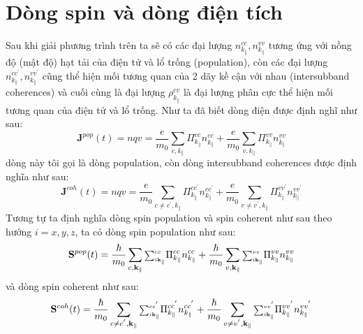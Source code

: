 \section{Dòng spin và dòng điện tích}
Sau khi giải phương trình trên ta sẽ có các đại lượng $n_{k_{\parallel}}^{cc},n_{k_{\parallel}}^{vv}$ tương ứng với nồng độ (mật độ)  hạt tải của điện tử và lổ trống (population), còn các đại lượng $n_{k_{\parallel}}^{cc^{'}},n_{k_{\parallel}}^{vv^{'}}$ cũng thể hiện mối tương quan của 2 dãy kề cận với nhau (intersubband coherences) và cuối cùng là đại lượng $\rho_{k_\parallel}^{cv}$ là đại lượng phân cực thể hiện mối tương quan của điện tử và lổ trống. Như ta đã biết dòng điện được định nghĩ như sau:
\begin{equation}
\mathbf{J}^{pop}(t) =nqv=\frac{e}{m_0}\sum_{c,k_{\parallel}}\Pi_{k_{\parallel}}^{cc}n_{k_{\parallel}}^{cc} +
\frac{e}{m_0}\sum_{v,k_{\parallel}}\Pi_{k_{\parallel}}^{vv}n_{k_{\parallel}}^{vv}
\end{equation}
dòng này tôi gọi là dòng population, còn dòng intersubband coherences được định nghĩa như sau:
\begin{equation}
\mathbf{J}^{coh}(t) =nqv=\frac{e}{m_0}\sum_{c\neq c^{'},k_{\parallel}}\Pi_{k_{\parallel}}^{cc^{'}}n_{k_{\parallel}}^{cc^{'}} +
\frac{e}{m_0}\sum_{v\neq v^{'},k_{\parallel}}\Pi_{k_{\parallel}}^{vv^{'}}n_{k_{\parallel}}^{vv^{'}}
\end{equation}
Tương tự ta định nghĩa dòng spin population và spin coherent như sau theo hướng $i=x,y,z$, ta có dòng spin population như sau: 
\begin{equation}
\mathbf{S}^{pop}(t) = \frac{\hbar}{m_0}\sum_{c,\mathbf{k}_\parallel}
{\displaystyle\mathsmaller{\mathsmaller{\sum\nolimits_{i\mathbf{k}_\parallel}^{cc}}}}
\Pi_{k_{\parallel}}^{cc}n_{k_{\parallel}}^{cc} +
\frac{\hbar}{m_0}\sum_{v,\mathbf{k}_\parallel}
{\displaystyle\mathsmaller{\mathsmaller{\sum\nolimits_{i\mathbf{k}_\parallel}^{vv}}}}
\Pi_{k_{\parallel}}^{vv}n_{k_{\parallel}}^{vv}
\end{equation}
và dòng spin coherent như sau:
\begin{equation}
\mathbf{S}^{coh}(t) = \frac{\hbar}{m_0}\sum_{c\neq c^{'},\mathbf{k}_\parallel}
{\displaystyle\mathsmaller{\mathsmaller{\sum\nolimits_{i\mathbf{k}_\parallel}^{cc^{'}}}}}
\Pi_{k_{\parallel}}^{cc^{'}}n_{k_{\parallel}}^{cc^{'}} +
\frac{\hbar}{m_0}\sum_{v\neq v^{'},\mathbf{k}_\parallel}
{\displaystyle\mathsmaller{\mathsmaller{\sum\nolimits_{i\mathbf{k}_\parallel}^{vv^{'}}}}}
\Pi_{k_{\parallel}}^{vv^{'}}n_{k_{\parallel}}^{vv^{'}}
\end{equation}
